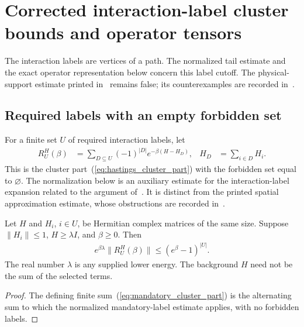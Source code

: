 \section{Corrected interaction-label cluster bounds and operator tensors}
\label{sec:corrected_cluster_mpo}

The interaction labels are vertices of a path. The normalized tail estimate
and the exact operator representation below concern this label cutoff.
The physical-support estimate printed in~\cite{Arad2016RigorousRG} remains
false; its counterexamples are recorded in~\cite{gap:alvv16_cluster_approximation}.

\subsection{Required labels with an empty forbidden set}

For a finite set $U$ of required interaction labels, let
\begin{align}
    R_U^H(\beta)
    &=\sum_{D\subseteq U}(-1)^{|D|}
      e^{-\beta(H-H_D)},
    &H_D&=\sum_{i\in D}H_i.
    \label{eq:mandatory_cluster_part}
\end{align}
This is the cluster part~(\ref{eq:hastings_cluster_part}) with the forbidden
set equal to $\varnothing$. The normalization below is an auxiliary
estimate for the interaction-label expansion related to the argument
of~\cite[lines 1270--1291 and 1935--1968]{Arad2016RigorousRG}.
It is distinct from the printed spatial approximation estimate, whose
obstructions are recorded in~\cite{gap:alvv16_cluster_approximation}.

\begin{lemma}
    \label{thm:mandatory_cluster_part_norm}
    \leanok

    Let $H$ and $H_i$, $i\in U$, be Hermitian complex matrices of the same
    size. Suppose $\|H_i\|\leq1$, $H\geq\lambda I$, and $\beta\geq0$.
    Then
    \begin{align}
        e^{\beta\lambda}\|R_U^H(\beta)\|
        \leq(e^\beta-1)^{|U|}.
        \label{eq:mandatory_cluster_part_norm}
    \end{align}
    The real number $\lambda$ is any supplied lower energy. The background
    $H$ need not be the sum of the selected terms.
\end{lemma}
\begin{proof}\leanok
    The defining finite sum~(\ref{eq:mandatory_cluster_part}) is the
    alternating sum to which the normalized mandatory-label estimate
    applies, with no forbidden labels.
\end{proof}

